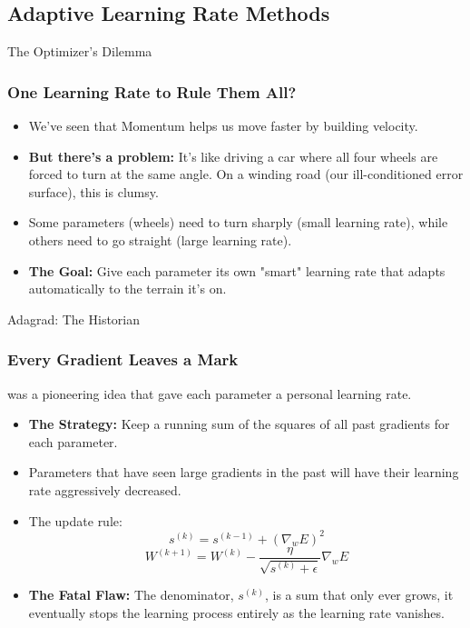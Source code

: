 \subsection{Adaptive Learning Rate Methods}

\begin{frame}{The Optimizer's Dilemma}
    \frametitle{One Learning Rate to Rule Them All?}
    \begin{itemize}
        \item We've seen that Momentum helps us move faster by building velocity.
        \item \textbf{But there's a problem:} It's like driving a car where all four wheels are forced to turn at the same angle. On a winding road (our ill-conditioned error surface), this is clumsy.
        \item Some parameters (wheels) need to turn sharply (small learning rate), while others need to go straight (large learning rate).
        \item \textbf{The Goal:} Give each parameter its own "smart" learning rate that adapts automatically to the terrain it's on.
    \end{itemize}
\end{frame}

\begin{frame}{Adagrad: The Historian}
    \frametitle{Every Gradient Leaves a Mark}
     was a pioneering idea that gave each parameter a personal learning rate.
    \begin{itemize}
        \item \textbf{The Strategy:} Keep a running sum of the squares of all past gradients for each parameter.
        \item Parameters that have seen large gradients in the past will have their learning rate aggressively decreased.
        \item The update rule:
            $$ s^{(k)} = s^{(k-1)} + (\nabla_w E)^2 $$
            $$ W^{(k+1)} = W^{(k)} - \frac{\eta}{\sqrt{s^{(k)} + \epsilon}} \nabla_w E $$
        \item \textbf{The Fatal Flaw:} The denominator, $s^{(k)}$, is a sum that only ever grows, it eventually stops the learning process entirely as the learning rate vanishes.
    \end{itemize}
\end{frame}

